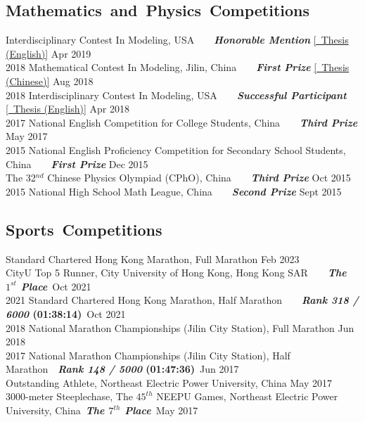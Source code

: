 \documentclass{my_cv}
\begin{document}
\subsection{\textbf{Mathematics~and~Physics~Competitions}}
 Interdisciplinary Contest In Modeling, USA~~~~\textbf{\emph{Honorable Mention}} \hfill \href{https://shuyuej.com/files/ICM-2019.pdf}{[\faFile~Thesis (English)]} Apr 2019 \\
2018 Mathematical Contest In Modeling, Jilin, China~~~~\textbf{\emph{First Prize}} \hfill \href{https://shuyuej.com/files/MCM-2018.pdf}{[\faFile~Thesis (Chinese)]} Aug 2018 \\
2018 Interdisciplinary Contest In Modeling, USA~~~~\textbf{\emph{Successful Participant}} \hfill \href{https://shuyuej.com/files/ICM-2018.pdf}{[\faFile~Thesis (English)]} Apr 2018 \\
2017 National English Competition for College Students, China~~~~\textbf{\emph{Third Prize}} \hfill May 2017 \\
2015 National English Proficiency Competition for Secondary School Students, China~~~~\textbf{\emph{First Prize}} \hfill Dec 2015 \\
The 32$^{nd}$ Chinese Physics Olympiad (CPhO), China~~~~\textbf{\emph{Third Prize}} \hfill Oct 2015 \\
2015 National High School Math League, China~~~~\textbf{\emph{Second Prize}} \hfill Sept 2015

\subsection{\textbf{Sports~Competitions}}
 Standard Chartered Hong Kong Marathon, Full Marathon \hfill Feb 2023 \\
CityU Top 5 Runner, City University of Hong Kong, Hong Kong SAR~~~~\textbf{\emph{The $1^{st}$ Place}}~\hfill Oct 2021\\
2021 Standard Chartered Hong Kong Marathon, Half Marathon~~~~\textbf{\emph{Rank 318 / 6000} (01:38:14)}~\hfill Oct 2021 \\
2018 National Marathon Championships (Jilin City Station), Full Marathon \hfill Jun 2018 \\
2017 National Marathon Championships (Jilin City Station), Half Marathon~~\textbf{\emph{Rank 148 / 5000} (01:47:36)}~\hfill Jun 2017 \\
Outstanding Athlete, Northeast Electric Power University, China \hfill May 2017\\
3000-meter Steeplechase, The $45^{th}$ NEEPU Games, Northeast Electric Power University, China~\textbf{\emph{The $7^{th}$ Place}}~\hfill May 2017
\end{document}
